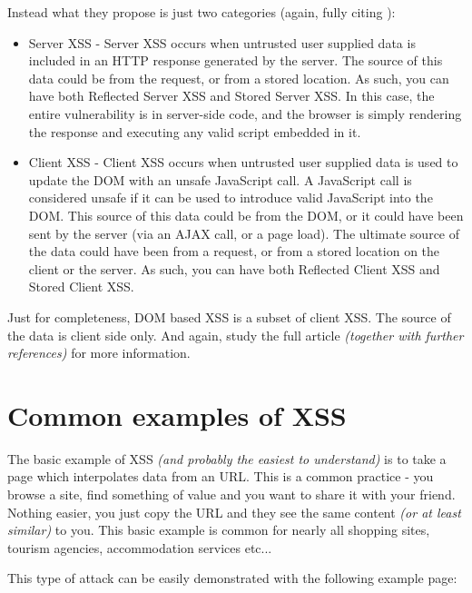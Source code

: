 Instead what they propose is just two categories (again, fully citing \cite{xss_owasp_types}):

\begin{itemize}
  \item  Server XSS - Server XSS occurs when untrusted user supplied data is included in an HTTP
        response generated by the server. The source of this data could be from the request, or from
        a stored location. As such, you can have both Reflected Server XSS and Stored Server XSS. In
        this case, the entire vulnerability is in server-side code, and the browser is simply
        rendering the response and executing any valid script embedded in it.
  \item  Client XSS - Client XSS occurs when untrusted user supplied data is used to update the DOM
        with an unsafe JavaScript call. A JavaScript call is considered unsafe if it can be used to
        introduce valid JavaScript into the DOM. This source of this data could be from the DOM, or
        it could have been sent by the server (via an AJAX call, or a page load). The ultimate
        source of the data could have been from a request, or from a stored location on the client
        or the server. As such, you can have both Reflected Client XSS and Stored Client XSS.
\end{itemize}

Just for completeness, DOM based XSS is a subset of client XSS. The source of the data is client
side only. And again, study the full article \cite{xss_owasp_types} \emph{(together with further
  references)} for more information.

\section{Common examples of XSS}

The basic example of XSS \emph{(and probably the easiest to understand)} is to take a page which
interpolates data from an URL. This is a common practice - you browse a site, find something of
value and you want to share it with your friend. Nothing easier, you just copy the URL and they see
the same content \emph{(or at least similar)} to you. This basic example is common for nearly all
shopping sites, tourism agencies, accommodation services etc...

This type of attack can be easily demonstrated with the following example page:
\bigskip

